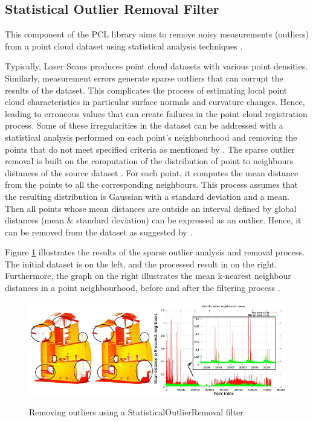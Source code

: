 \documentclass[12pt]{report}
\begin{document}
\subsection{Statistical Outlier Removal Filter}
\label{section:StatisticalOutlierRemovalFilter}

This component of the PCL library aims to remove noisy measurements (outliers) from a point cloud dataset using statistical analysis techniques .

Typically, Laser Scans produces point cloud datasets with various point densities. Similarly, measurement errors generate sparse outliers that can corrupt the results of the dataset.
This complicates the process of estimating local point cloud characteristics in particular surface normals and curvature changes. Hence, leading to erroneous values that can create failures in the point cloud registration process.
Some of these irregularities in the dataset can be addressed with a statistical analysis performed on each point's neighbourhood and removing the points that do not meet specified criteria as mentioned by .
The sparse outlier removal is built on the computation of the distribution of point to neighbours distances of the source dataset .
For each point, it computes the mean distance from the points to all the corresponding neighbours. This process assumes that the resulting distribution is Gaussian with a standard deviation and a mean.
Then all points whose mean distances are outside an interval defined by global distances (mean \& standard deviation) can be expressed as an outlier. Hence, it can be removed from the dataset as suggested by .

Figure \ref{fig:statistical_removal_2} illustrates the results of the sparse outlier analysis and removal process.
The initial dataset is on the left, and the processed result in on the right. Furthermore, the graph on the right illustrates the mean k-nearest neighbour distances in a point 
neighbourhood, before and after the filtering process \cite[]{Rusu_ICRA2011_PCL}.

\begin{figure}[H]%
  \centering
  \includegraphics[width=1\textwidth]{statistical_removal_2.jpg}
 \caption{Removing outliers using a StatisticalOutlierRemoval filter}\cite[]{Rusu_ICRA2011_PCL}
 \label{fig:statistical_removal_2} 
\end{figure}
\end{document}
